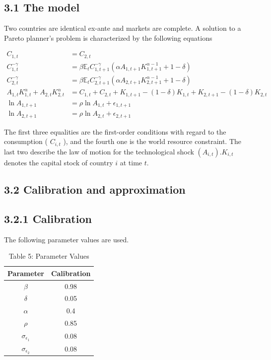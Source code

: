 \documentclass[10pt]{article}
\begin{document}
\subsection*{3.1 The model}
Two countries are identical ex-ante and markets are complete. A solution to a Pareto planner's problem is characterized by the following equations

$$
\begin{aligned}
C_{1, t} & =C_{2, t} \\
C_{1, t}^{-\gamma} & =\beta \mathbb{E}_{t} C_{1, t+1}^{-\gamma}\left(\alpha A_{1, t+1} K_{1, t+1}^{\alpha-1}+1-\delta\right) \\
C_{2, t}^{-\gamma} & =\beta \mathbb{E}_{t} C_{2, t+1}^{-\gamma}\left(\alpha A_{2, t+1} K_{2, t+1}^{\alpha-1}+1-\delta\right) \\
A_{1, t} K_{1, t}^{\alpha}+A_{2, t} K_{2, t}^{\alpha} & =C_{1, t}+C_{2, t}+K_{1, t+1}-(1-\delta) K_{1, t}+K_{2, t+1}-(1-\delta) K_{2, t} \\
\ln A_{1, t+1} & =\rho \ln A_{1, t}+\epsilon_{1, t+1} \\
\ln A_{2, t+1} & =\rho \ln A_{2, t}+\epsilon_{2, t+1}
\end{aligned}
$$

The first three equalities are the first-order conditions with regard to the consumption ( $C_{i, t}$ ), and the fourth one is the world resource constraint. The last two describe the law of motion for the technological shock $\left(A_{i, t}\right) . K_{i, t}$ denotes the capital stock of country $i$ at time $t$.

\subsection*{3.2 Calibration and approximation}
\subsection*{3.2.1 Calibration}
The following parameter values are used.

\begin{table}[h]
\begin{center}
\begin{tabular}{cc}
\hline\hline
Parameter & Calibration \\
\hline
$\beta$ & 0.98 \\
$\delta$ & 0.05 \\
$\alpha$ & 0.4 \\
$\rho$ & 0.85 \\
$\sigma_{\epsilon_{1}}$ & 0.08 \\
$\sigma_{\epsilon_{2}}$ & 0.08 \\
\hline\hline
\end{tabular}
\captionsetup{labelformat=empty}
\caption{Table 5: Parameter Values}
\end{center}
\end{table}
\end{document}
